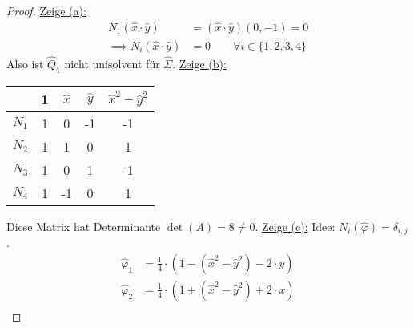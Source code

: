 \begin{proof}
	\underline{Zeige (a):}
	\begin{align*}
		N_1(\hat{x}\cdot\hat{y})&=(\hat{x}\cdot\hat{y})(0,-1)=0\\
		\implies N_i(\hat{x}\cdot\hat{y})&=0\qquad\forall i\in\lbrace1,2,3,4\rbrace
	\end{align*}
	Also ist $\hat{Q}_1$ nicht unisolvent für $\hat{\Sigma}$.\nl
	\underline{Zeige (b):}\\
	\begin{tabular}{c|cccc}
		& 1 & $\hat{x}$ & $\hat{y}$ & $\hat{x}^2-\hat{y}^2$\\ \hline
		$N_1$ & 1 & 0 & -1 & -1\\
		$N_2$ & 1 & 1 & 0 & 1\\
		$N_3$ & 1 & 0 & 1 & -1\\
		$N_4$ & 1 & -1 & 0 & 1
	\end{tabular}
	Diese Matrix hat Determinante $\det(A)=8\neq0$.\nl
	\underline{Zeige (c):} 
	Idee: $N_i(\hat{\varphi})=\delta_{i,j}$.
	\begin{align*}
		\hat{\varphi}_1&=\frac{1}{4}\cdot\left(1-\left(\hat{x}^2-\hat{y}^2\right)-2\cdot y\right)\\
		\hat{\varphi}_2&=\frac{1}{4}\cdot\left(1+\left(\hat{x}^2-\hat{y}^2\right)+2\cdot x\right)\\
	\end{align*}
	

\end{proof}
